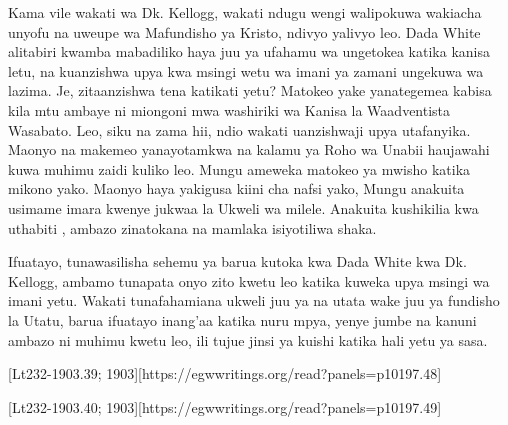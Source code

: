 Kama vile wakati wa Dk. Kellogg, wakati ndugu wengi walipokuwa wakiacha unyofu na uweupe wa Mafundisho ya Kristo, ndivyo yalivyo leo. Dada White alitabiri kwamba mabadiliko haya juu ya ufahamu wa  ungetokea katika kanisa letu, na kuanzishwa upya kwa msingi wetu wa imani ya zamani ungekuwa wa lazima. Je,  zitaanzishwa tena katikati yetu? Matokeo yake yanategemea kabisa kila mtu ambaye ni miongoni mwa washiriki wa Kanisa la Waadventista Wasabato. Leo, siku na zama hii, ndio wakati uanzishwaji upya utafanyika. Maonyo na makemeo yanayotamkwa na kalamu ya Roho wa Unabii haujawahi kuwa muhimu zaidi kuliko leo. Mungu ameweka matokeo ya mwisho katika mikono yako. Maonyo haya yakigusa kiini cha nafsi yako, Mungu anakuita usimame imara kwenye jukwaa la Ukweli wa milele. Anakuita kushikilia kwa uthabiti , ambazo zinatokana na mamlaka isiyotiliwa shaka.

Ifuatayo, tunawasilisha sehemu ya barua kutoka kwa Dada White kwa Dk. Kellogg, ambamo tunapata onyo zito kwetu leo katika kuweka upya msingi wa imani yetu. Wakati tunafahamiana ukweli juu ya  na utata wake juu ya fundisho la Utatu, barua ifuatayo inang'aa katika nuru mpya, yenye jumbe na kanuni ambazo ni muhimu kwetu leo, ili tujue jinsi ya kuishi katika hali yetu ya sasa.


[Lt232-1903.39; 1903][https://egwwritings.org/read?panels=p10197.48]

[Lt232-1903.40; 1903][https://egwwritings.org/read?panels=p10197.49]

